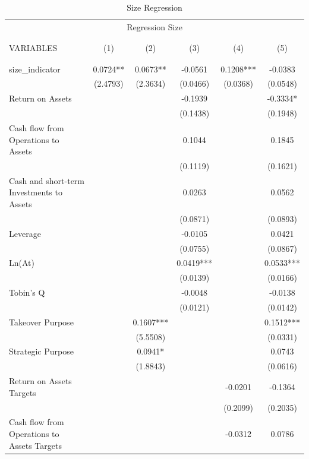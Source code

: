 \documentclass[12pt]{article}
\begin{document}
	\begin{table}[ht]
		\centering
		\caption{Size Regression}

		\begin{adjustbox}{height=10cm, max width=\textwidth}
			\begin{tabular}{lccccc}
				\multicolumn{6}{c}{Regression Size} \\ \\ \hline
					 \\
				VARIABLES & (1) & (2) & (3) & (4) & (5) \\ \\ \hline
					&  &  &  &  &  \\
				size\_indicator & 0.0724** & 0.0673** & -0.0561 & 0.1208*** & -0.0383 \\
					& (2.4793) & (2.3634) & (0.0466) & (0.0368) & (0.0548) \\
				Return on Assets &  &  & -0.1939 &  & -0.3334* \\
					&  &  & (0.1438) &  & (0.1948) \\
				Cash flow from Operations to Assets &  &  & 0.1044 &  & 0.1845 \\
					&  &  & (0.1119) &  & (0.1621) \\
				Cash and short-term Investments to Assets &  &  & 0.0263 &  & 0.0562 \\
					&  &  & (0.0871) &  & (0.0893) \\
				Leverage &  &  & -0.0105 &  & 0.0421 \\
					&  &  & (0.0755) &  & (0.0867) \\
				Ln(At) &  &  & 0.0419*** &  & 0.0533*** \\
					&  &  & (0.0139) &  & (0.0166) \\
				Tobin's Q &  &  & -0.0048 &  & -0.0138 \\
					&  &  & (0.0121) &  & (0.0142) \\
				Takeover Purpose &  & 0.1607*** &  &  & 0.1512*** \\
					&  & (5.5508) &  &  & (0.0331) \\
				Strategic Purpose &  & 0.0941* &  &  & 0.0743 \\
					&  & (1.8843) &  &  & (0.0616) \\
				Return on Assets Targets &  &  &  & -0.0201 & -0.1364 \\
					&  &  &  & (0.2099) & (0.2035) \\
				Cash flow from Operations to Assets Targets &  &  &  & -0.0312 & 0.0786 \\

\end{tabular}
\end{adjustbox}
\end{table}
\end{document}

